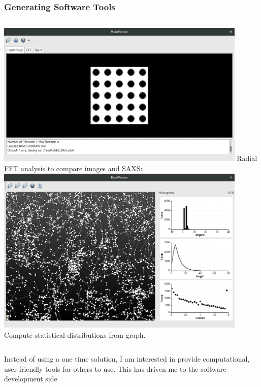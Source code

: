 \documentclass[9pt]{beamer}
\begin{document}
\begin{frame}
  \frametitle{Generating Software Tools}
  \begin{columns}[onlytextwidth]
      \includegraphics[width=0.9\textwidth]{./Figures/software_screenshots/fft_screenshot.png}
      \vspace{1cm}
      Radial FFT analysis to compare images and SAXS:
      \includegraphics[width=0.9\textwidth]{./Figures/software_screenshots/graph_to_distrutions.png}
      \vspace{1cm}
      Compute statistical distributions from graph.
  \end{columns}
  \note
  {
    Instead of using a one time solution, I am interested in provide computational, user friendly tools for others to use.\newline
    This has driven me to the software development side
  }
\end{frame}
\end{document}
